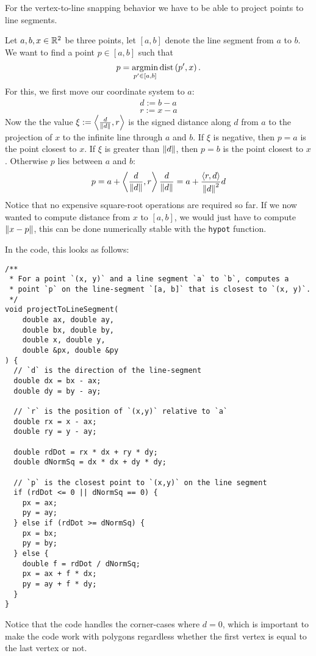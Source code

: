 \documentclass{scrartcl}
\DeclareMathOperator{\argmin}{argmin}
\DeclareMathOperator{\dist}{dist}
\newcommand{\exercise}[2]{\vspace{1em}\noindent{\bf Exercise #1 (#2)}}
\begin{document}
\hfill 
{\footnotesize }
\newline
{\footnotesize }

\noindent\hrulefill

\exercise{3.1}{Polygon picking and snapping}
For the vertex-to-line snapping behavior we have to be able to project points 
to line segments.

Let $a, b, x\in \mathbb{R}^2$ be three points, let $[a, b]$ denote the line segment
from $a$ to $b$. We want to find a point $p\in[a,b]$ such that
\[
  p = \argmin_{p^\prime \in [a, b]}\dist\rPar{p^\prime, x}.
\]
For this, we first move our coordinate system to $a$:
\begin{align*}
  d := b - a \\
  r := x - a
\end{align*}
Now the the value $\xi := \left\langle\frac{d}{\left\lVert d\right\rVert},r\right\rangle$ is the signed 
distance along $d$ from $a$ to the projection of $x$ to the infinite line
through $a$ and $b$. 
If $\xi$ is negative, then $p = a$ is the point closest to $x$.
If $\xi$ is greater than $\left\lVert d\right\rVert$, then $p = b$ is the point closest to $x$.
Otherwise $p$ lies between $a$ and $b$:
\[
  p = a + \left\langle\frac{d}{\left\lVert d\right\rVert},r\right\rangle\frac{d}{\left\lVert d\right\rVert} 
    = a + \frac{\left\langle r,d\right\rangle}{\left\lVert d\right\rVert^2}d
\]
Notice that no expensive square-root operations are required so far. 
If we now wanted to compute distance from $x$ to $[a, b]$, we would just have
to compute $\left\lVert x - p\right\rVert$, 
this can be done numerically stable with the \verb|hypot| function.

In the code, this looks as follows:
\begin{lstlisting}
/**
 * For a point `(x, y)` and a line segment `a` to `b`, computes a
 * point `p` on the line-segment `[a, b]` that is closest to `(x, y)`.
 */
void projectToLineSegment(
    double ax, double ay,
    double bx, double by,
    double x, double y,
    double &px, double &py
) {
  // `d` is the direction of the line-segment
  double dx = bx - ax;
  double dy = by - ay;

  // `r` is the position of `(x,y)` relative to `a`
  double rx = x - ax;
  double ry = y - ay;

  double rdDot = rx * dx + ry * dy;
  double dNormSq = dx * dx + dy * dy;

  // `p` is the closest point to `(x,y)` on the line segment 
  if (rdDot <= 0 || dNormSq == 0) {
    px = ax;
    py = ay;
  } else if (rdDot >= dNormSq) {
    px = bx;
    py = by;
  } else {
    double f = rdDot / dNormSq;
    px = ax + f * dx;
    py = ay + f * dy;
  }
}
\end{lstlisting}
Notice that the code handles the corner-cases where $d = 0$, which is 
important to make the code work with polygons regardless whether the first
vertex is equal to the last vertex or not.
\end{document}
